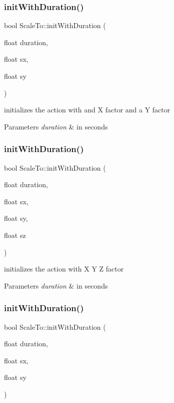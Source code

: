 \subsubsection{\texorpdfstring{init\+With\+Duration()}{initWithDuration()}\hspace{0.1cm}{\footnotesize\ttfamily [1/4]}}
{\footnotesize\ttfamily bool Scale\+To\+::init\+With\+Duration (\begin{DoxyParamCaption}\item[{float}]{duration,  }\item[{float}]{sx,  }\item[{float}]{sy }\end{DoxyParamCaption})}

initializes the action with and X factor and a Y factor 
\begin{DoxyParams}{Parameters}
{\em duration} & in seconds \\
\hline
\end{DoxyParams}
\mbox{\label{classScaleTo_aff69915e68ddbaa502d82a72e5787bf8}} 
\subsubsection{\texorpdfstring{init\+With\+Duration()}{initWithDuration()}\hspace{0.1cm}{\footnotesize\ttfamily [2/4]}}
{\footnotesize\ttfamily bool Scale\+To\+::init\+With\+Duration (\begin{DoxyParamCaption}\item[{float}]{duration,  }\item[{float}]{sx,  }\item[{float}]{sy,  }\item[{float}]{sz }\end{DoxyParamCaption})}

initializes the action with X Y Z factor 
\begin{DoxyParams}{Parameters}
{\em duration} & in seconds \\
\hline
\end{DoxyParams}
\mbox{\label{classScaleTo_ab9b91e0f4ecfc3fad18cb4f929bd5e18}} 
\subsubsection{\texorpdfstring{init\+With\+Duration()}{initWithDuration()}\hspace{0.1cm}{\footnotesize\ttfamily [3/4]}}
{\footnotesize\ttfamily bool Scale\+To\+::init\+With\+Duration (\begin{DoxyParamCaption}\item[{float}]{duration,  }\item[{float}]{sx,  }\item[{float}]{sy }\end{DoxyParamCaption})}


